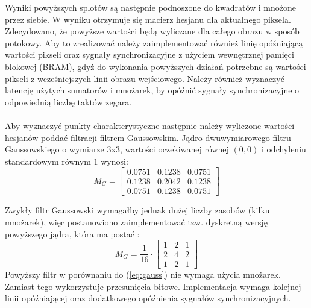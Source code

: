 Wyniki powyższych splotów są następnie podnoszone do kwadratów i mnożone przez siebie. 
W wyniku otrzymuje się macierz hesjanu dla aktualnego piksela. Zdecydowano, że powyższe wartości będą wyliczane dla całego obrazu w sposób potokowy.
Aby to zrealizować należy zaimplementować również linię opóźniającą wartości pikseli oraz sygnały synchronizacyjne z użyciem wewnętrznej pamięci blokowej (BRAM), gdyż do wykonania powyższych działań potrzebne są wartości pikseli z wcześniejszych linii obrazu wejściowego.
Należy również wyznaczyć latencję użytych sumatorów i mnożarek, by opóźnić sygnały synchronizacyjne o odpowiednią liczbę taktów zegara.

\paragraph*{}

Aby wyznaczyć punkty charakterystyczne następnie należy wyliczone wartości hesjanów poddać filtracji filtrem Gaussowskim. 
Jądro dwuwymiarowego filtru Gaussowskiego o wymiarze \(3\)x\(3\), wartości oczekiwanej równej \((0,0)\) i odchyleniu standardowym równym \(1\) wynosi:
\begin{equation}
\label{eq:gauss}
M_G=
	\begin{bmatrix}
	0.0751 & 0.1238 & 0.0751\\
	0.1238 & 0.2042 & 0.1238\\
	0.0751 & 0.1238 & 0.0751
	\end{bmatrix}
\end{equation}

Zwykły filtr Gaussowski wymagałby jednak dużej liczby zasobów (kilku mnożarek), więc postanowiono zaimplementować tzw. dyskretną wersję powyższego jądra, która ma postać \cite{Benda}:
\begin{equation}
M_G=\frac{1}{16} \cdot
	\begin{bmatrix}
	1 & 2 & 1\\
	2 & 4 & 2\\
	1 & 2 & 1
	\end{bmatrix}
\end{equation}
Powyższy filtr w porównaniu do (\ref{eq:gauss}) nie wymaga użycia mnożarek. Zamiast tego wykorzystuje przesunięcia bitowe. Implementacja wymaga kolejnej linii opóźniającej oraz dodatkowego opóźnienia sygnałów synchronizacyjnych.


